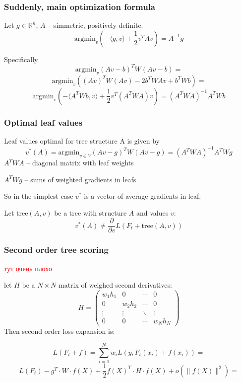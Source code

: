 \documentclass{beamer}
\begin{document}
\begin{frame}
\frametitle{Suddenly, main optimization formula}
Let $g \in \mathbb{R}^n$, $A$ -- simmetric, positively definite.
$$ \mathrm{argmin}_{v} \left(-\langle g, v\rangle + \frac12 v^T A v \right) = A^{-1}g$$

Specifically
$$ \mathrm{argmin}_{v} (Av - b)^TW(Av - b) = $$
$$ \mathrm{argmin}_{v} \left( (Av)^TW(Av) - 2 b^TWAv + b^TWb \right) = $$
$$ \mathrm{argmin}_{v} \left(-\langle A^T W b, v \rangle + \frac12 v^T(A^TWA)v\right) = (A^TWA)^{-1} A^TW b $$

\end{frame}

\begin{frame}
\frametitle{Optimal leaf values}

Leaf values optimal for tree structure A is given by
$$ v^*(A) = \mathrm{argmin}_{v \in V} (Av - g)^TW(Av- g) = (A^T W A)^{-1} A^T W g$$
$A^T W A$ -- diagonal matrix with leaf weights \par
$A^T W g$ -- sums of weighted gradients in leafs \par
So in the simplest case $v^*$ is a vector of average gradients in leaf.\par

Let $\mathrm{tree}(A, v)$ be a tree with structure $A$ and values $v$:
$$v^*(A) \ne \frac{\partial}{\partial v} L(F_t + \mathrm{tree}(A, v))$$

\end{frame}

\begin{frame}
\frametitle{Second order tree scoring}

\begin{center}
	\textcolor{red}{тут очень плохо}\par
\end{center}

let $H$ be a $N\times N$ matrix of weighed second derivatives:
$$ H = 
\begin{pmatrix}
	w_1 h_1 & 0 & \cdots & 0 \\
	0 & w_2 h_2 & \cdots & 0 \\
	\vdots  & \vdots  & \ddots & \vdots  \\
	0 & 0 & \cdots & w_N h_N
\end{pmatrix}
$$
Then second order loss expansion is:\par
$$ L(F_t + f) = \sum_{i=1}^N w_i L(y, F_t(x_i) + f(x_i)) = $$
$$ L(F_t) - g^T \cdot W \cdot f(X) + \frac12 f(X)^T \cdot H \cdot f(X) +  o(\|f(X)\|^2) = $$

\end{frame}
\end{document}

